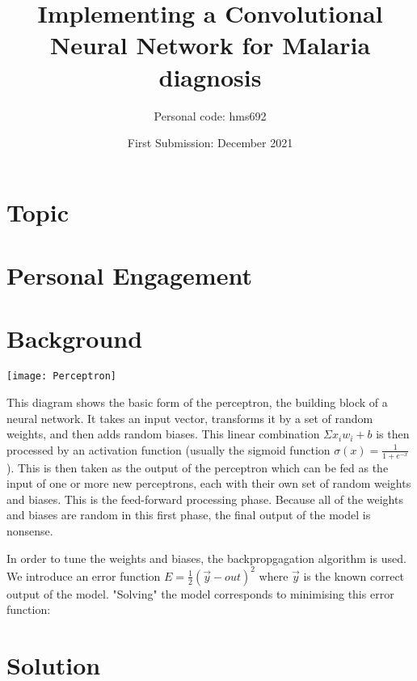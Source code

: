 \documentclass[12pt]{article}
\title{Implementing a Convolutional Neural Network for Malaria diagnosis}
\author{Personal code: hms692}
\date{First Submission: December 2021}
\begin{document}
\maketitle

\section{Topic}

\section{Personal Engagement}

\section{Background}
\texttt{[image: Perceptron]}

This diagram shows the basic form of the perceptron, the building block of a neural network. It takes an input vector, transforms it by a set of random weights, and then adds random biases. This linear combination $\Sigma x_i w_i + b$ is then processed by an activation function (usually the sigmoid function $\sigma(x) = \frac{1}{1 + e^{-x}}$). This is then taken as the output of the perceptron which can be fed as the input of one or more new perceptrons, each with their own set of random weights and biases. This is the feed-forward processing phase. Because all of the weights and biases are random in this first phase, the final output of the model is nonsense. 

In order to tune the weights and biases, the backpropgagation algorithm is used. We introduce an error function $E = \frac{1}{2}(\vec{y} - out)^2$ where $\vec{y}$ is the known correct output of the model. "Solving" the model corresponds to minimising this error function: 

\section{Solution}
\end{document}
